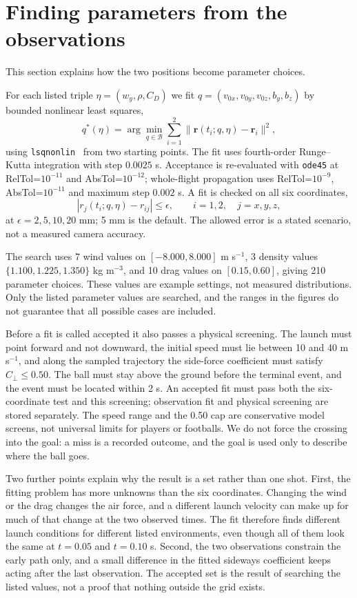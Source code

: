 \documentclass[11pt,a4paper]{article}
\begin{document}
\section{Finding parameters from the observations}
This section explains how the two positions become parameter choices.

For each listed triple $\eta=(w_y,\rho,C_D)$ we fit $q=(v_{0x},v_{0y},v_{0z},b_y,b_z)$ by bounded nonlinear least squares,
\begin{equation}
q^*(\eta)=\arg\min_{q\in\mathcal B}\sum_{i=1}^{2}
\|\mathbf r(t_i;q,\eta)-\mathbf r_i\|^2,
\label{eq:fit}
\end{equation}
using \texttt{lsqnonlin}~\cite{lsq} from two starting points. The fit uses fourth-order Runge--Kutta integration with step $0.0025$ s. Acceptance is re-evaluated with \texttt{ode45} at RelTol=$10^{-11}$ and AbsTol=$10^{-12}$; whole-flight propagation uses RelTol=$10^{-9}$, AbsTol=$10^{-11}$ and maximum step $0.002$ s. A fit is checked on all six coordinates,
\begin{equation}
|r_j(t_i;q,\eta)-r_{ij}|\le\epsilon,
\qquad i=1,2,\quad j=x,y,z,
\label{eq:tol}
\end{equation}
at $\epsilon=2,5,10,20$ mm; 5 mm is the default. The allowed error is a stated scenario, not a measured camera accuracy.

The search uses 7 wind values on $[-8.000,8.000]$ m s$^{-1}$, 3 density values $\{1.100, 1.225, 1.350\}$ kg m$^{-3}$, and 10 drag values on $[0.15,0.60]$, giving 210 parameter choices. These values are example settings, not measured distributions. Only the listed parameter values are searched, and the ranges in the figures do not guarantee that all possible cases are included.

Before a fit is called accepted it also passes a physical screening. The launch must point forward and not downward, the initial speed must lie between 10 and 40 m s$^{-1}$, and along the sampled trajectory the side-force coefficient must satisfy $C_\perp\le0.50$. The ball must stay above the ground before the terminal event, and the event must be located within 2 s. An accepted fit must pass both the six-coordinate test and this screening; observation fit and physical screening are stored separately. The speed range and the 0.50 cap are conservative model screens, not universal limits for players or footballs. We do not force the crossing into the goal: a miss is a recorded outcome, and the goal is used only to describe where the ball goes.

Two further points explain why the result is a set rather than one shot. First, the fitting problem has more unknowns than the six coordinates. Changing the wind or the drag changes the air force, and a different launch velocity can make up for much of that change at the two observed times. The fit therefore finds different launch conditions for different listed environments, even though all of them look the same at $t=0.05$ and $t=0.10$ s. Second, the two observations constrain the early path only, and a small difference in the fitted sideways coefficient keeps acting after the last observation. The accepted set is the result of searching the listed values, not a proof that nothing outside the grid exists.
\end{document}
